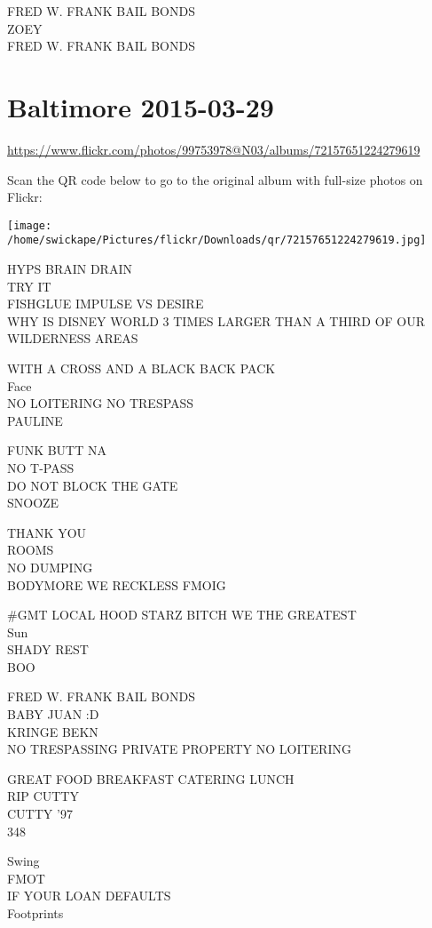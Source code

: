 \documentclass[10pt,letterpaper]{article}
\begin{document}
FRED W. FRANK BAIL BONDS\\
ZOEY\\
FRED W. FRANK BAIL BONDS


\section*{Baltimore 2015-03-29}

\url{https://www.flickr.com/photos/99753978@N03/albums/72157651224279619}

Scan the QR code below to go to the original album with full-size photos on Flickr:

\texttt{[image: /home/swickape/Pictures/flickr/Downloads/qr/72157651224279619.jpg]}


HYPS BRAIN DRAIN\\
TRY IT\\
FISHGLUE IMPULSE VS DESIRE\\
WHY IS DISNEY WORLD 3 TIMES LARGER THAN A THIRD OF OUR WILDERNESS AREAS

WITH A CROSS AND A BLACK BACK PACK\\
Face\\
NO LOITERING NO TRESPASS\\
PAULINE

FUNK BUTT NA\\
NO T{-}PASS\\
DO NOT BLOCK THE GATE\\
SNOOZE

THANK YOU\\
ROOMS\\
NO DUMPING\\
BODYMORE WE RECKLESS FMOIG

\#GMT LOCAL HOOD STARZ BITCH WE THE GREATEST\\
Sun\\
SHADY REST\\
BOO

FRED W. FRANK BAIL BONDS\\
BABY JUAN :D\\
KRINGE BEKN\\
NO TRESPASSING PRIVATE PROPERTY NO LOITERING

GREAT FOOD BREAKFAST CATERING LUNCH\\
RIP CUTTY\\
CUTTY '97\\
348

Swing\\
FMOT\\
IF YOUR LOAN DEFAULTS\\
Footprints
\end{document}
